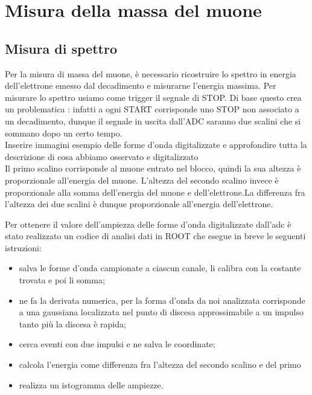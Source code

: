 \documentclass[10pt,a4paper]{article}
\begin{document}
\section{Misura della massa del muone}




\subsection{Misura di spettro}
\begin{flushleft}
Per la misura di massa del muone, è necessario ricostruire lo spettro in energia dell'elettrone emesso dal decadimento e misurarne l'energia massima.
Per misurare lo spettro usiamo come trigger il segnale di STOP. Di base questo crea un problematica : infatti a ogni START corrisponde uno STOP non associato a un decadimento, dunque il segnale in uscita dall'ADC saranno due scalini che si sommano dopo un certo tempo.\\
Inserire immagini esempio delle forme d'onda digitalizzate e approfondire tutta la descrizione di cosa abbiamo osservato e digitalizzato
\\
Il primo scalino corrisponde al muone entrato nel blocco, quindi la sua altezza è proporzionale all'energia del muone. L'altezza del secondo scalino invece è proporzionale alla somma dell'energia del muone e dell'elettrone.La differenza fra l'altezza dei due scalini è dunque proporzionale all'energia dell'elettrone. 

Per ottenere il valore dell'ampiezza delle forme d'onda digitalizzate dall'adc è stato realizzato un codice di analisi dati in ROOT che esegue in breve le seguenti istruzioni:
\begin{itemize}
\item salva le forme d'onda campionate a ciascun canale, li calibra con la costante trovata e poi li somma;
\item ne fa la derivata numerica, per la forma d'onda da noi analizzata corrisponde a una gaussiana localizzata nel punto di discesa approssimabile a un impulso tanto più la discesa è rapida;
\item cerca eventi con due impulsi e ne salva le coordinate;
\item calcola l'energia come differenza fra l'altezza del secondo scalino e del primo
\item realizza un istogramma delle ampiezze.
\end{itemize}

\end{flushleft}
\end{document}

